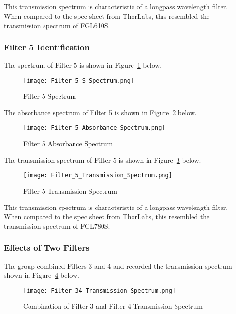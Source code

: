 \documentclass{article}
\begin{document}
This transmission spectrum is characteristic of a longpass wavelength filter. When compared to the spec sheet from ThorLabs, this resembled the transmission spectrum of FGL610S.

\subsubsection{Filter 5 Identification}
The spectrum of Filter 5 is shown in Figure~\ref{fig:filter 5 S spectrum} below.

\begin{figure} [h!]
    \centering
    \texttt{[image: Filter\_5\_S\_Spectrum.png]}
    \caption{Filter 5 Spectrum}
    \label{fig:filter 5 S spectrum}
\end{figure}

The absorbance spectrum of Filter 5 is shown in Figure~\ref{fig:filter 5 A spectrum} below.

\begin{figure} [h!]
    \centering
    \texttt{[image: Filter\_5\_Absorbance\_Spectrum.png]}
    \caption{Filter 5 Absorbance Spectrum}
    \label{fig:filter 5 A spectrum}
\end{figure}

The transmission spectrum of Filter 5 is shown in Figure~\ref{fig:filter 5 T spectrum} below.

\begin{figure} [h!]
    \centering
    \texttt{[image: Filter\_5\_Transmission\_Spectrum.png]}
    \caption{Filter 5 Transmission Spectrum}
    \label{fig:filter 5 T spectrum}
\end{figure}

This transmission spectrum is characteristic of a longpass wavelength filter. When compared to the spec sheet from ThorLabs, this resembled the transmission spectrum of FGL780S.

\subsubsection{Effects of Two Filters}

The group combined Filters 3 and 4 and recorded the transmission spectrum shown in Figure~\ref{fig:filter 34 T spectrum} below.

\begin{figure} [h!]
    \centering
    \texttt{[image: Filter\_34\_Transmission\_Spectrum.png]}
    \caption{Combination of Filter 3 and Filter 4 Transmission Spectrum}
    \label{fig:filter 34 T spectrum}
\end{figure}
\end{document}
